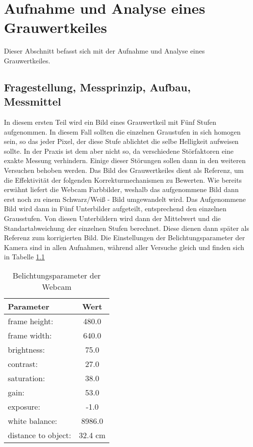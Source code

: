 %
%
\chapter{Aufnahme und Analyse eines Grauwertkeiles}
\label{chap:VERSUCH_1}
Dieser Abschnitt befasst sich mit der Aufnahme und Analyse eines Grauwertkeiles.
\section{Fragestellung, Messprinzip, Aufbau, Messmittel}
\label{chap:VERSUCH_1_FRAGESTELLUNG}
In diesem ersten Teil wird ein Bild eines Grauwertkeil mit Fünf Stufen aufgenommen. In diesem Fall sollten die einzelnen Graustufen in sich homogen sein, so das jeder Pixel, der diese Stufe ablichtet die selbe Helligkeit aufweisen sollte. In der Praxis ist dem aber nicht so, da verschiedene Störfaktoren eine exakte Messung verhindern. Einige dieser Störungen sollen dann in den weiteren Versuchen behoben werden. Das Bild des Grauwertkeiles dient als Referenz, um die Effektivität der folgenden Korrekturmechanismen zu Bewerten. Wie bereits erwähnt liefert die Webcam Farbbilder, weshalb das aufgenommene Bild dann erst noch zu einem Schwarz/Weiß - Bild umgewandelt wird. Das Aufgenommene Bild wird dann in Fünf Unterbilder aufgeteilt, entsprechend den einzelnen Grausstufen. Von diesen Unterbildern wird dann der Mittelwert und die Standartabweichung der einzelnen Stufen berechnet. Diese dienen dann später als Referenz zum korrigierten Bild. Die Einstellungen der Belichtungsparameter der Kamera sind in allen Aufnahmen, während aller Versuche gleich und finden sich in Tabelle \ref{tab:BelichtungsParamter}


\begin{table}[H]
\centering
\begin{tabular}{l|c}
Parameter & Wert \\
\hline
frame height: & 480.0 \\
frame width: & 640.0 \\
\hline
brightness:  &  75.0 \\
contrast:    &  27.0 \\
saturation:  &  38.0\\
gain:        &  53.0\\
exposure:    &  -1.0\\
\hline
white balance: & 8986.0 \\
\hline
distance to object: & 32.4 cm \\
\end{tabular}
\caption{Belichtungsparameter der Webcam}
\label{tab:BelichtungsParamter}
\end{table}


